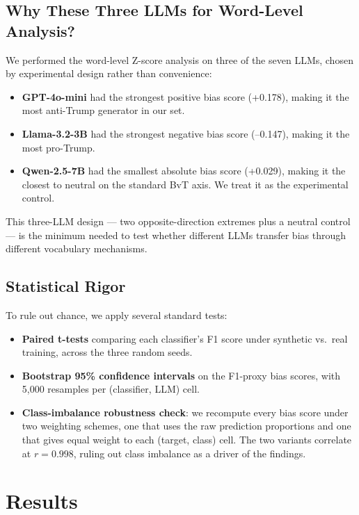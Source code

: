 \documentclass[11pt]{article}
\begin{document}
\subsection{Why These Three LLMs for Word-Level Analysis?}

We performed the word-level Z-score analysis on three of the seven LLMs, chosen by experimental design rather than convenience:

\begin{itemize}
    \item \textbf{GPT-4o-mini} had the strongest positive bias score (+0.178), making it the most anti-Trump generator in our set.
    \item \textbf{Llama-3.2-3B} had the strongest negative bias score (--0.147), making it the most pro-Trump.
    \item \textbf{Qwen-2.5-7B} had the smallest absolute bias score (+0.029), making it the closest to neutral on the standard BvT axis. We treat it as the experimental control.
\end{itemize}

This three-LLM design --- two opposite-direction extremes plus a neutral control --- is the minimum needed to test whether different LLMs transfer bias through different vocabulary mechanisms.

\subsection{Statistical Rigor}

To rule out chance, we apply several standard tests:
\begin{itemize}
    \item \textbf{Paired t-tests} comparing each classifier's F1 score under synthetic vs.~real training, across the three random seeds.
    \item \textbf{Bootstrap 95\% confidence intervals} on the F1-proxy bias scores, with 5{,}000 resamples per (classifier, LLM) cell.
    \item \textbf{Class-imbalance robustness check}: we recompute every bias score under two weighting schemes, one that uses the raw prediction proportions and one that gives equal weight to each (target, class) cell. The two variants correlate at $r = 0.998$, ruling out class imbalance as a driver of the findings.
\end{itemize}

\section{Results}
\end{document}

